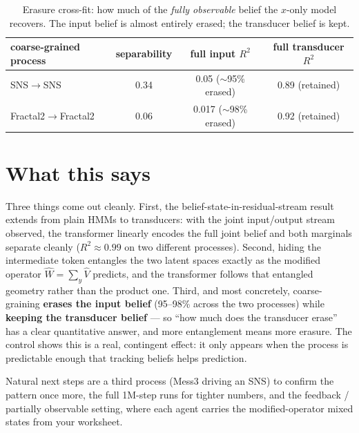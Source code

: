 \documentclass[11pt]{article}
\begin{document}
\begin{table}[H]\centering\small
\begin{tabular}{lccc}
\toprule
coarse-grained process & separability & full \textbf{input} $R^2$ & full \textbf{transducer} $R^2$ \\
\midrule
SNS$\to$SNS           & 0.34 & 0.05\phantom{0} \; ($\sim$95\% erased) & 0.89 \; (retained) \\
Fractal2$\to$Fractal2 & 0.06 & 0.017 \; ($\sim$98\% erased)          & 0.92 \; (retained) \\
\bottomrule
\end{tabular}
\caption{Erasure cross-fit: how much of the \emph{fully observable} belief the $x$-only model
recovers. The input belief is almost entirely erased; the transducer belief is kept.}
\end{table}

\section{What this says}

Three things come out cleanly. First, the belief-state-in-residual-stream result extends from plain
HMMs to transducers: with the joint input/output stream observed, the transformer linearly encodes
the full joint belief and both marginals separate cleanly ($R^2\approx0.99$ on two different
processes). Second, hiding the intermediate token entangles the two latent spaces exactly as the
modified operator $\hat W=\sum_y\hat V$ predicts, and the transformer follows that entangled geometry
rather than the product one. Third, and most concretely, coarse-graining \textbf{erases the input
belief} (95--98\% across the two processes) while \textbf{keeping the transducer belief} --- so
``how much does the transducer erase'' has a clear quantitative answer, and more entanglement means
more erasure. The control shows this is a real, contingent effect: it only appears when the process
is predictable enough that tracking beliefs helps prediction.

Natural next steps are a third process (Mess3 driving an SNS) to confirm the pattern once more, the
full 1M-step runs for tighter numbers, and the feedback / partially observable setting, where each
agent carries the modified-operator mixed states from your worksheet.
\end{document}
